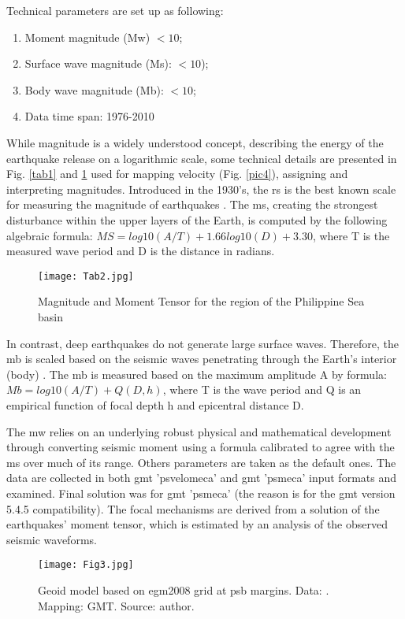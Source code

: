 \documentclass{rrparticle}
\begin{document}
Technical parameters are set up as following: 
\begin{enumerate}\itemsep -0.5em 
  \item Moment magnitude (Mw) $<10$; 
  \item Surface wave magnitude (Ms): $<10$);
  \item Body wave magnitude (Mb): $<10$;  
  \item Data time span: 1976-2010
 \end{enumerate}
 
While magnitude is a widely understood concept, describing the energy of the earthquake release on a logarithmic scale, some technical details are presented in Fig. \ref{tab1} and \ref{tab2} used for mapping velocity (Fig. \ref{pic4}), assigning and interpreting magnitudes. Introduced in the 1930's, the \ac{rs} is the best known scale for measuring the magnitude of earthquakes \cite{Mueller}. The \ac{ms}, creating the strongest disturbance within the upper layers of the Earth, is computed by the following algebraic formula:
	$MS=log10(A/T)+1.66log10(D)+3.30$,
where T is the measured wave period and D is the distance in radians. 

\begin{figure}[H]
\centering
\texttt{[image: Tab2.jpg]}
\caption{Magnitude and Moment Tensor for the region of the Philippine Sea basin}
\label{tab2}
\end{figure}

In contrast, deep earthquakes do not generate large surface waves. Therefore, the \ac{mb} is scaled based on the seismic waves penetrating through the Earth's interior (body) \cite{Mueller}. The \ac{mb} is measured based on the maximum amplitude A by formula:
	$Mb=log10(A/T)+Q(D,h)$,
where T is the wave period and Q is an empirical function of focal depth h and epicentral distance D.
		
The \ac{mw} relies on an underlying robust physical and mathematical development through converting seismic moment using a formula calibrated to agree with the \ac{ms} over much of its range. Others parameters are taken as the default ones. The data are collected in both \ac{gmt} 'psvelomeca' and \ac{gmt} 'psmeca' input formats and examined. Final solution was for \ac{gmt} 'psmeca' (the reason is for the \ac{gmt} version 5.4.5 compatibility). The focal mechanisms are derived from a solution of the earthquakes' moment tensor, which is estimated by an analysis of the observed seismic waveforms. 
	
\begin{figure}[H]
\centering
\texttt{[image: Fig3.jpg]}
\caption{Geoid model based on \ac{egm2008} grid at \ac{psb} margins. Data: \cite{Pavlis}. Mapping: GMT. Source: author.}
\label{pic3}
\end{figure}
\end{document}
